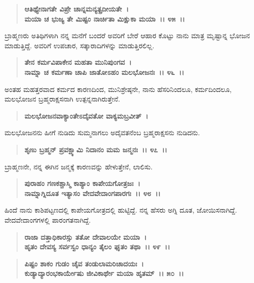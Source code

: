\begin{verse}
\textbf{ಆತಿಥ್ಯೇನಾಗತೇ ವಿಪ್ರೇ ಚಾನ್ನಮನ್ಯತ್ಪ್ರದೀಯತೇ~।}\\\textbf{ಮಯಾ ಚ ಭುಜ್ಯ ತೇ ಮಿಷ್ಟಂ ನಾರ್ಚಿತಾ ಮಿಕ್ಷುಕಾ ಮಯಾ~।। ೪೫~।।}
\end{verse}

ಬ್ರಾಹ್ಮಣರು ಅತಿಥಿಗಳಾಗಿ ನನ್ನ ಮನೆಗೆ ಬಂದರೆ ಅವರಿಗೆ ಬೇರೆ ಆಹಾರ ಕೊಟ್ಟು ನಾನು ಮಾತ್ರ ಮೃಷ್ಟಾನ್ನ ಭೋಜನ ಮಾಡುತ್ತಿದ್ದೆ. ಅವರಿಗೆ ಉಪಚಾರ, ಸತ್ಕಾರಾದಿಗಳನ್ನು ಮಾಡುತ್ತಿರಲಿಲ್ಲ.

\begin{verse}
\textbf{ತೇನ ಕರ್ಮವಿಪಾಕೇನ ಮಹತಾ ಮುನಿಪುಂಗವ~।}\\\textbf{ನಾಮ್ನಾ ಚ ಕರ್ಮಣಾ ಚಾಪಿ ಜಾತೋಽಹಂ ಮಲಭೋಜನಃ~।। ೪೬~।।}
\end{verse}

ಅಂತಹ ಮಹತ್ತರವಾದ ಕರ್ಮದ ಕಾರಣದಿಂದ, ಮುನಿಶ್ರೇಷ್ಠನೇ, ನಾನು ಹೆಸರಿನಿಂದಲೂ, ಕರ್ಮದಿಂದಲೂ, ಮಲಭೋಜನ ಬ್ರಹ್ಮರಾಕ್ಷಸನಾಗಿ ಉತ್ಪನ್ನನಾಗಿರುತ್ತೇನೆ.

\begin{verse}
\textbf{ಮಲಭೋಜನವಾಕ್ಯಾಂತೇಽದೈವತೋ ವಾಕ್ಯಮಬ್ರವೀತ್~।}
\end{verse}

ಮಲಭೋಜನನು ಹೀಗೆ ನುಡಿದು ಸುಮ್ಮನಾಗಲು ಅದೈವತನೆಂಬ ಬ್ರಹ್ಮರಾಕ್ಷಸನು ನುಡಿದನು.

\begin{verse}
\textbf{ಶೃಣು ಬ್ರಹ್ಮನ್ ಪ್ರವಕ್ಷ್ಯಾಮಿ ನಿದಾನಂ ಮಮ ಜನ್ಮನಃ~।। ೪೭~।।}
\end{verse}

ಬ್ರಾಹ್ಮಣನೇ, ನನ್ನ ಈಗಿನ ಜನ್ಮಕ್ಕೆ ಕಾರಣವನ್ನು ಹೇಳುತ್ತೇನೆ, ಲಾಲಿಸು.

\begin{verse}
\textbf{ಪುರಾಹಂ ಗಣಕಶ್ಚಾಸ್ಮಿ ಕಾಶ್ಯಾಂ ಕಾಪೇಯಗೋತ್ರಜಃ~।}\\\textbf{ನಾಮ್ನಾಗ್ನಿದೂತ ಇತ್ಯಾಸಂ ವೇದವೇದಾಂಗಪಾರಗಃ~।। ೪೮~।।}
\end{verse}

ಹಿಂದೆ ನಾನು ಕಾಶಿಪಟ್ಟಣದಲ್ಲಿ ಕಾಪೇಯಗೋತ್ರದಲ್ಲಿ ಹುಟ್ಟಿದ್ದೆ. ನನ್ನ ಹೆಸರು ಅಗ್ನಿ ದೂತ, ಜೋಯಿಸನಾಗಿದ್ದೆ. ವೇದವೇದಾಂಗಗಳಲ್ಲಿ ಪಾರಂಗತನಾಗಿದ್ದೆ.

\begin{verse}
\textbf{ರಾಜಾ ದತ್ತಾಧಿಕಾರಸ್ಸು ತತೋ ದೇವಾಲಯೇ ಮಯಾ~।}\\\textbf{ಹೃತಂ ದೇವಸ್ಯ ಸರ್ವಸ್ವಂ ಧಾನ್ಯಂ ತೈಲಂ ಘೃತಂ ತಥಾ~।। ೪೯~।। }
\end{verse}

\begin{verse}
\textbf{ಪಿಷ್ಟಂ ಶಾಕಂ ಗುಡಂ ಚೈವ ತಂಡುಲಾಮರಿಚಾದಯಃ~।}\\\textbf{ಕುಡ್ಯಾದ್ಯಾರಂಭಕಾರ್ಯೇಷು ಜೀವಿಕಾರ್ಥೇ ಮಯಾ ಹೃತಮ್~।। ೫೦~।।}
\end{verse}

